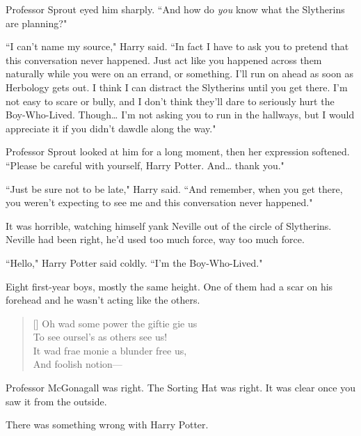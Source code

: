\later

Professor Sprout eyed him sharply. ``And how do \emph{you} know what the Slytherins are planning?"

``I can't name my source," Harry said. ``In fact I have to ask you to pretend that this conversation never happened. Just act like you happened across them naturally while you were on an errand, or something. I'll run on ahead as soon as Herbology gets out. I think I can distract the Slytherins until you get there. I'm not easy to scare or bully, and I don't think they'll dare to seriously hurt the Boy-Who-Lived. Though{\ldots} I'm not asking you to run in the hallways, but I would appreciate it if you didn't dawdle along the way."

Professor Sprout looked at him for a long moment, then her expression softened. ``Please be careful with yourself, Harry Potter. And{\ldots} thank you."

``Just be sure not to be late," Harry said. ``And remember, when you get there, you weren't expecting to see me and this conversation never happened."

\later

It was horrible, watching himself yank Neville out of the circle of Slytherins. Neville had been right, he'd used too much force, way too much force.

``Hello," Harry Potter said coldly. ``I'm the Boy-Who-Lived."

Eight first-year boys, mostly the same height. One of them had a scar on his forehead and he wasn't acting like the others.

\baselineskip\settowidth{\versewidth}{It wad frae monie a blunder free us,}
\begin{verse}[\versewidth]
Oh wad some power the giftie gie us\\
To see oursel's as others see us!\\
It wad frae monie a blunder free us,\\
And foolish notion---
\end{verse}

Professor McGonagall was right. The Sorting Hat was right. It was clear once you saw it from the outside.

There was something wrong with Harry Potter.

